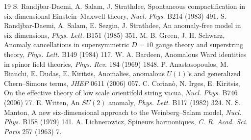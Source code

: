 \documentclass[11pt,letterpaper]{article}
\begin{document}
{\begin{thebibliography}{19}
 S. Randjbar-Daemi, A. Salam, J. Strathdee, Spontaneous compactification in six-dimensional Einstein--Maxwell theory, \emph{Nucl. Phys.} B214 (1983) 491.
 S. Randjbar-Daemi, A. Salam, E. Sezgin, J. Strathdee, An anomaly-free model in six dimensions, \emph{Phys. Lett.} B151 (1985) 351.
 M. B. Green, J. H. Schwarz, Anomaly cancellations in supersymmetric $D=10$ gauge theory and superstring theory, \emph{Phys. Lett.} B149 (1984) 117.
 W. A. Bardeen, Anomalous Ward identities in spinor field theories, \emph{Phys. Rev.} 184 (1969) 1848.
 P. Anastasopoulos, M. Bianchi, E. Dudas, E. Kiritsis, Anomalies, anomalous $U(1)$'s and generalized Chern--Simons terms, \emph{JHEP} 0611 (2006) 057.
 C. Corian\`o, N. Irges, E. Kiritsis, On the effective theory of low scale orientifold string vacua, \emph{Nucl. Phys.} B746 (2006) 77.
 E. Witten, An $SU(2)$ anomaly, \emph{Phys. Lett.} B117 (1982) 324.
 N. S. Manton, A new six-dimensional approach to the Weinberg--Salam model, \emph{Nucl. Phys.} B158 (1979) 141.
 A. Lichnerowicz, Spineurs harmoniques, \emph{C. R. Acad. Sci. Paris} 257 (1963) 7.
\end{thebibliography}}
\end{document}

